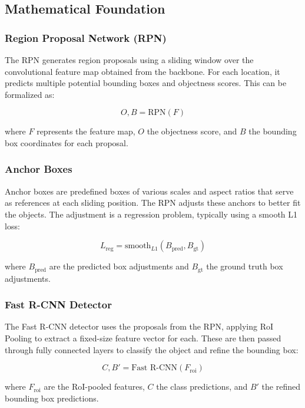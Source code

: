 \documentclass[12pt,oneside]{book} %
\begin{document}
\subsection{Mathematical Foundation}
\subsubsection{Region Proposal Network (RPN)}
The RPN generates region proposals using a sliding window over the
convolutional feature map obtained from the backbone. For each location, it
predicts multiple potential bounding boxes and objectness scores. This can be
formalized as:

\begin{equation}
    O, B = \text{RPN}(F)
\end{equation}

where $F$ represents the feature map, $O$ the objectness score, and $B$ the
bounding box coordinates for each proposal.

\subsubsection{Anchor Boxes}
Anchor boxes are predefined boxes of various scales and aspect ratios that
serve as references at each sliding position. The RPN adjusts these anchors to
better fit the objects. The adjustment is a regression problem, typically using
a smooth L1 loss:

\begin{equation}
    L_{\text{reg}} = \text{smooth}_{L1}(B_{\text{pred}}, B_{\text{gt}})
\end{equation}

where $B_{\text{pred}}$ are the predicted box adjustments and $B_{\text{gt}}$
the ground truth box adjustments.

\subsubsection{Fast R-CNN Detector}
The Fast R-CNN detector uses the proposals from the RPN, applying RoI Pooling
to extract a fixed-size feature vector for each. These are then passed through
fully connected layers to classify the object and refine the bounding box:

\begin{equation}
    C, B' = \text{Fast R-CNN}(F_{\text{roi}})
\end{equation}

where $F_{\text{roi}}$ are the RoI-pooled features, $C$ the class predictions,
and $B'$ the refined bounding box predictions.
\end{document}
